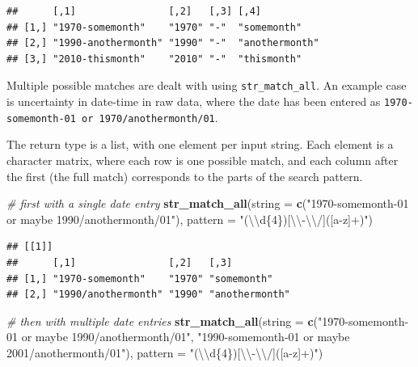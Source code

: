 \documentclass[]{book}
\newenvironment{Shaded}{}{}
\newcommand{\CharTok}[1]{\textcolor[rgb]{0.25,0.44,0.63}{#1}}
\newcommand{\CommentTok}[1]{\textcolor[rgb]{0.38,0.63,0.69}{\textit{#1}}}
\newcommand{\DataTypeTok}[1]{\textcolor[rgb]{0.56,0.13,0.00}{#1}}
\newcommand{\KeywordTok}[1]{\textcolor[rgb]{0.00,0.44,0.13}{\textbf{#1}}}
\newcommand{\NormalTok}[1]{#1}
\newcommand{\StringTok}[1]{\textcolor[rgb]{0.25,0.44,0.63}{#1}}
\begin{document}
\begin{verbatim}
##      [,1]                [,2]   [,3] [,4]          
## [1,] "1970-somemonth"    "1970" "-"  "somemonth"   
## [2,] "1990-anothermonth" "1990" "-"  "anothermonth"
## [3,] "2010-thismonth"    "2010" "-"  "thismonth"
\end{verbatim}

Multiple possible matches are dealt with using \texttt{str\_match\_all}. An example case is uncertainty in date-time in raw data, where the date has been entered as \texttt{1970-somemonth-01\ or\ 1970/anothermonth/01}.

The return type is a list, with one element per input string. Each element is a character matrix, where each row is one possible match, and each column after the first (the full match) corresponds to the parts of the search pattern.

\begin{Shaded}
\begin{Highlighting}[]
\CommentTok{# first with a single date entry}
\KeywordTok{str_match_all}\NormalTok{(}\DataTypeTok{string =} \KeywordTok{c}\NormalTok{(}\StringTok{"1970-somemonth-01 or maybe 1990/anothermonth/01"}\NormalTok{),}
              \DataTypeTok{pattern =} \StringTok{"(}\CharTok{\textbackslash{}\textbackslash{}}\StringTok{d\{4\})[}\CharTok{\textbackslash{}\textbackslash{}}\StringTok{-}\CharTok{\textbackslash{}\textbackslash{}}\StringTok{/]([a-z]+)"}\NormalTok{)}
\end{Highlighting}
\end{Shaded}

\begin{verbatim}
## [[1]]
##      [,1]                [,2]   [,3]          
## [1,] "1970-somemonth"    "1970" "somemonth"   
## [2,] "1990/anothermonth" "1990" "anothermonth"
\end{verbatim}

\begin{Shaded}
\begin{Highlighting}[]
\CommentTok{# then with multiple date entries}
\KeywordTok{str_match_all}\NormalTok{(}\DataTypeTok{string =} \KeywordTok{c}\NormalTok{(}\StringTok{"1970-somemonth-01 or maybe 1990/anothermonth/01"}\NormalTok{,}
                         \StringTok{"1990-somemonth-01 or maybe 2001/anothermonth/01"}\NormalTok{),}
              \DataTypeTok{pattern =} \StringTok{"(}\CharTok{\textbackslash{}\textbackslash{}}\StringTok{d\{4\})[}\CharTok{\textbackslash{}\textbackslash{}}\StringTok{-}\CharTok{\textbackslash{}\textbackslash{}}\StringTok{/]([a-z]+)"}\NormalTok{)}
\end{Highlighting}
\end{Shaded}
\end{document}

